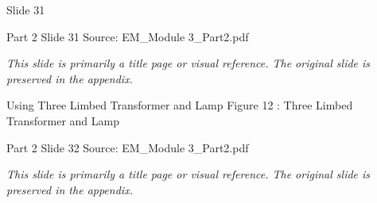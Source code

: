 \documentclass[11pt,a4paper]{article}
\begin{document}
\begin{mdframed}[roundcorner=9pt,backgroundcolor=white,linecolor=anthGreen,linewidth=1pt,innerleftmargin=12pt,innerrightmargin=12pt,innertopmargin=10pt,innerbottommargin=10pt,skipabove=8pt,skipbelow=10pt]
{\HeadingFont\fontsize{15}{18}\selectfont\color{anthDark}Slide 31\par}
{\color{anthMid}\small Part 2 \textbullet{} Slide 31 \textbullet{} Source: EM\_Module 3\_Part2.pdf\par}
\vspace{0.5em}
{\small
\textit{This slide is primarily a title page or visual reference. The original slide is preserved in the appendix.}

}
\end{mdframed}

\begin{mdframed}[roundcorner=9pt,backgroundcolor=white,linecolor=anthOrange,linewidth=1pt,innerleftmargin=12pt,innerrightmargin=12pt,innertopmargin=10pt,innerbottommargin=10pt,skipabove=8pt,skipbelow=10pt]
{\HeadingFont\fontsize{15}{18}\selectfont\color{anthDark}Using Three Limbed Transformer and Lamp Figure 12 : Three Limbed Transformer and Lamp\par}
{\color{anthMid}\small Part 2 \textbullet{} Slide 32 \textbullet{} Source: EM\_Module 3\_Part2.pdf\par}
\vspace{0.5em}
{\small
\textit{This slide is primarily a title page or visual reference. The original slide is preserved in the appendix.}

}
\end{mdframed}
\end{document}
